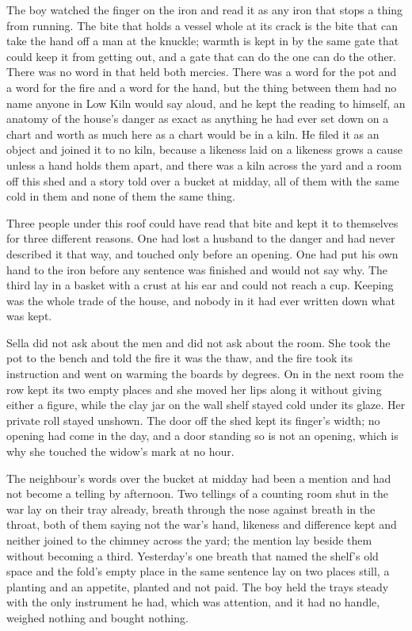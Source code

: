 The boy watched the finger on the iron and read it as any iron that stops a thing from running. The bite that holds a vessel whole at its crack is the bite that can take the hand off a man at the knuckle; warmth is kept in by the same gate that could keep it from getting out, and a gate that can do the one can do the other. There was no word in  that held both mercies. There was a word for the pot and a word for the fire and a word for the hand, but the thing between them had no name anyone in Low Kiln would say aloud, and he kept the reading to himself, an anatomy of the house's danger as exact as anything he had ever set down on a chart and worth as much here as a chart would be in a kiln. He filed it as an object and joined it to no kiln, because a likeness laid on a likeness grows a cause unless a hand holds them apart, and there was a kiln across the yard and a room off this shed and a story told over a bucket at midday, all of them with the same cold in them and none of them the same thing.

Three people under this roof could have read that bite and kept it to themselves for three different reasons. One had lost a husband to the danger and had never described it that way, and touched  only before an opening. One had put his own hand to the iron before any sentence was finished and would not say why. The third lay in a basket with a crust at his ear and could not reach a cup. Keeping was the whole trade of the house, and nobody in it had ever written down what was kept.

Sella did not ask about the men and did not ask about the room. She took the pot to the bench and told the fire it was the thaw, and the fire took its instruction and went on warming the boards by degrees. On  in the next room the row kept its two empty places and she moved her lips along it without giving either a figure, while the clay jar on the wall shelf stayed cold under its glaze. Her private roll stayed unshown. The door off the shed kept its finger's width; no opening had come in the day, and a door standing so is not an opening, which is why she touched the widow's mark at no hour.

The neighbour's words over the bucket at midday had been a mention and had not become a telling by afternoon. Two tellings of a counting room shut in the war lay on their tray already, breath through the nose against breath in the throat, both of them saying not the war's hand, likeness and difference kept and neither joined to the chimney across the yard; the mention lay beside them without becoming a third. Yesterday's one breath that named the shelf's old space and the fold's empty place in the same sentence lay on two places still, a planting and an appetite, planted and not paid. The boy held the trays steady with the only instrument he had, which was attention, and it had no handle, weighed nothing and bought nothing.


